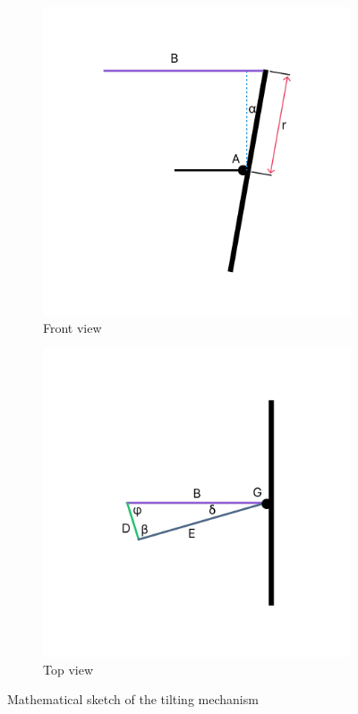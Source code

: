 %
\begin{figure}
  \begin{subfigure}[b]{0.49\textwidth}
    \includegraphics[width=\textwidth]{src/assets/pictures/construction/math_front.png}
    \caption{Front view}
    \label{fig:const:tilt:math_front}
  \end{subfigure}
  \hfill
  \begin{subfigure}[b]{0.49\textwidth}
    \includegraphics[width=\textwidth]{src/assets/pictures/construction/math_top.png}
    \caption{Top view}
    \label{fig:const:tilt:math_top}
  \end{subfigure}
  \caption{Mathematical sketch of the tilting mechanism}
  \label{fig:const:tilt:math}
\end{figure}
